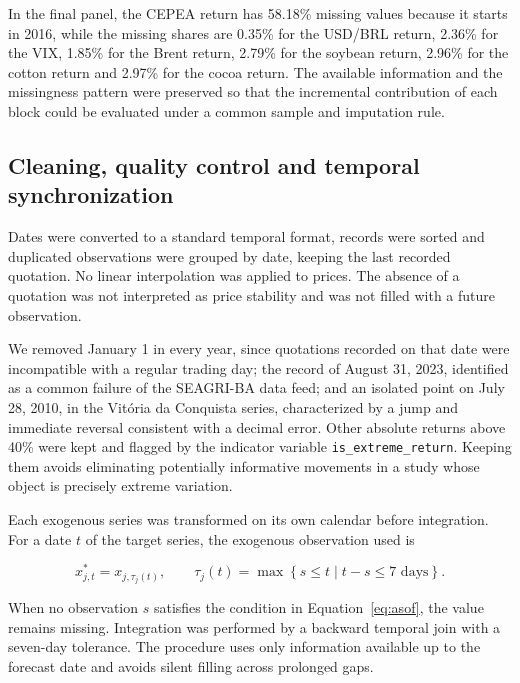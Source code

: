 \documentclass[a4paper,fleqn]{cas-sc}
\begin{document}
In the final panel, the CEPEA return has 58.18\% missing values because it starts in 2016, while the missing shares are 0.35\% for the USD/BRL return, 2.36\% for the VIX, 1.85\% for the Brent return, 2.79\% for the soybean return, 2.96\% for the cotton return and 2.97\% for the cocoa return. The available information and the missingness pattern were preserved so that the incremental contribution of each block could be evaluated under a common sample and imputation rule.

\subsection{Cleaning, quality control and temporal synchronization}
\label{subsec:data_cleaning}

Dates were converted to a standard temporal format, records were sorted and duplicated observations were grouped by date, keeping the last recorded quotation. No linear interpolation was applied to prices. The absence of a quotation was not interpreted as price stability and was not filled with a future observation.

We removed January 1 in every year, since quotations recorded on that date were incompatible with a regular trading day; the record of August 31, 2023, identified as a common failure of the SEAGRI-BA data feed; and an isolated point on July 28, 2010, in the Vitória da Conquista series, characterized by a jump and immediate reversal consistent with a decimal error. Other absolute returns above 40\% were kept and flagged by the indicator variable \texttt{is\_extreme\_return}. Keeping them avoids eliminating potentially informative movements in a study whose object is precisely extreme variation.

Each exogenous series was transformed on its own calendar before integration. For a date \(t\) of the target series, the exogenous observation used is

\begin{equation}
x_{j,t}^{*}=x_{j,\tau_j(t)},
\qquad
\tau_j(t)=\max\left\{s\leq t\;|\;t-s\leq 7\text{ days}\right\}.
\label{eq:asof}
\end{equation}

When no observation \(s\) satisfies the condition in Equation~\ref{eq:asof}, the value remains missing. Integration was performed by a backward temporal join with a seven-day tolerance. The procedure uses only information available up to the forecast date and avoids silent filling across prolonged gaps.
\end{document}

